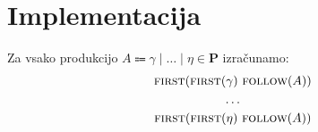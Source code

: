 \documentclass{article}
\newcommand{\FIRST}{\textsc{first}}
\newcommand{\FOLLOW}{\textsc{follow}}
\newcommand{\Set}[1]{\mathbf{#1}}
\newcommand{\Productions}{\Set{P}}
\newcommand{\Null}{\varepsilon}
\newcommand{\Language}[1]{\mathcal{L}(#1)}
\newcommand{\Arrow}{\Coloneq}
\newcommand{\Seq}{\ }
\newcommand{\Union}{\mathrel{|}}
\begin{document}
%
%



\section{Implementacija}

Za vsako produkcijo $A \Arrow \gamma \Union \dots \Union \eta \in \Productions$ izračunamo:
\begin{gather*}
  \FIRST(\FIRST(\gamma) \Seq \FOLLOW(A))\\
  \dots\\
  \FIRST(\FIRST(\eta) \Seq \FOLLOW(A))
\end{gather*}
\end{document}
